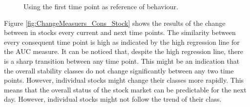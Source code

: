 \begin{figure}[!h]
{\begin{minipage}{\dimexpr \textwidth-2\fboxsep-2\fboxrule}
    \end{minipage}}
    \caption{Using the first time point as reference of behaviour.}
    \label{fig:ChangeMeasuers_First_Stock}
\end{figure}

Figure \ref{fig:ChangeMeasuers_Cons_Stock} shows the results of the change between in stocks every current and next time points. The similarity between every consequent time point is high as indicated by the high regression line for the AUC measure. It can be noticed that, despite the high regression line, there is a sharp transition between any time point. This might be an indication that the overall stability classes do not change significantly between any two time points. However, individual stocks might change their classes more rapidly. This means that the overall status of the stock market can be predictable for the next day. However, individual stocks might not follow the trend of their class.

